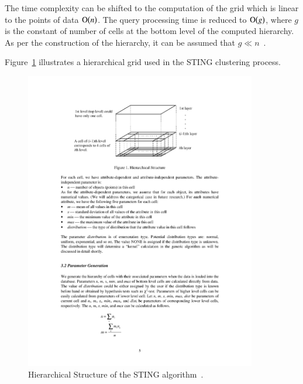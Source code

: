 The time complexity can be shifted to the computation of the grid which is linear to the points of data $\operatorname{O}\bigl(n\bigr)$. The query processing time is reduced to $\operatorname{O}\bigl(g\bigr)$, where $g$ is the constant of number of cells at the bottom level of the computed hierarchy. As per the construction of the hierarchy, it can be assumed that $g \ll n$~\cite{Varlaro08spatial, Wang97sting}.  

Figure~\ref{fig:clustering-sting} illustrates a hierarchical grid used in the STING clustering process.

\begin{figure}[h]
  \begin{center}
    \includegraphics[width=0.9\textwidth]{figures/clustering_sting.pdf}
    \caption{Hierarchical Structure of the STING algorithm~\cite[p 5]{Wang97sting}.}
    \label{fig:clustering-sting}
  \end{center}
\end{figure}




















